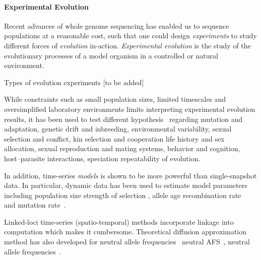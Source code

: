 \documentclass[11pt]{article}
\begin{document}
\paragraph{Experimental Evolution}
Recent advances of whole genome sequencing has enabled us to sequence 
populations at a reasonable cost, such that one could design \emph{experiments} 
to study different forces of \emph{evolution} in-action. \emph{Experimental 
evolution} is the study of the evolutionary processes of a model organism in a 
controlled  
\cite{hegreness2006equivalence,lang2013pervasive,orozco2012adaptation,
	lang2011genetic,barrick2009genome,bollback2007clonal} 
or natural 
	\cite{maldarelli2013hiv,reid2011new,denef2012situ,winters2012development,
	daniels2013genetic,barrett2008natural,bergland2014genomic} environment.

Types of evolution experiments \cite{Barrick2013Genome} [to be added]

While constraints such as small population sizes, limited timescales and 
oversimplified  laboratory
 environments limits interpreting experimental evolution results, it has
  been used to test different hypothesis~\cite{kawecki2012experimental}
   regarding
mutation and adaptation, 
genetic drift and inbreeding, 
environmental variability,
sexual selection and conflict, 
kin selection and cooperation
life history and sex allocation, 
sexual reproduction and mating systems, 
behavior and cognition, 
host–parasite interactions, 
speciation
repeatability of evolution.

In addition, time-series \emph{models} is shown to be more powerful 
\cite{boyko2008assessing,desai2008polymorphism,sawyer1992population} 
than single-snapshot data.
In particular, dynamic data has been used to estimate model parameters 
including population size
\cite{williamson1999using,wang2001pseudo,pollak1983new,waples1989generalized,
	Terhorst2015Multi}
strength of selection
\cite{mathieson2013estimating,illingworth2011distinguishing,Terhorst2015Multi,
	bollback2008estimation,illingworth2012quantifying,malaspinas2012estimating,
	Steinrücken2014a, malaspinas2012estimating}, allele age
 \cite{malaspinas2012estimating}
recombination rate~\cite{Terhorst2015Multi}  and mutation
 rate~\cite{Barrick2013Genome, Terhorst2015Multi}. 

Linked-loci time-series (spatio-temporal) methods 
\cite{illingworth2011distinguishing,illingworth2012quantifying,
	Barrick2013Genome,Terhorst2015Multi} incorporate linkage into computation
 which makes it cumbersome. Theoretical diffusion approximation method has also 
 developed for neutral allele frequencies~\cite{Ewens2012Mathematical, 
 kimura1955solution}
neutral AFS~\cite{evans2007non}, neutral allele
 frequencies~\cite{song2012simple}.
\end{document}
